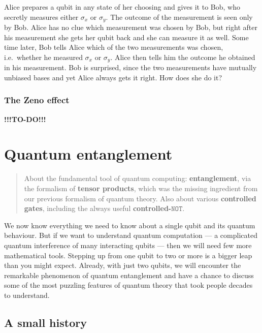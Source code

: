 \documentclass[fleqn]{article}
\let\oldsection\section
\renewcommand\section{\clearpage\oldsection}
\begin{document}
Alice prepares a qubit in any state of her choosing and gives it to Bob, who secretly measures either \(\sigma_x\) or \(\sigma_y\).
The outcome of the measurement is seen only by Bob.
Alice has no clue which measurement was chosen by Bob, but right after his measurement she gets her qubit back and she can measure it as well.
Some time later, Bob tells Alice which of the two measurements was chosen, i.e.~whether he measured \(\sigma_x\) or \(\sigma_y\).
Alice then tells him the outcome he obtained in his measurement.
Bob is surprised, since the two measurements have mutually unbiased bases and yet Alice always gets it right.
How does she do it?

\hypertarget{the-zeno-effect}{%
\subsubsection{The Zeno effect}\label{the-zeno-effect}}

\textbf{!!!TO-DO!!!}

\hypertarget{chapter5}{%
\section{Quantum entanglement}\label{chapter5}}

\begin{quote}
About the fundamental tool of quantum computing: \textbf{entanglement}, via the formalism of \textbf{tensor products}, which was the missing ingredient from our previous formalism of quantum theory.
Also about various \textbf{controlled gates}, including the always useful \textbf{controlled-\(\texttt{NOT}\)}.
\end{quote}

We now know everything we need to know about a single qubit and its quantum behaviour.
But if we want to understand quantum computation --- a complicated quantum interference of many interacting qubits --- then we will need few more mathematical tools.
Stepping up from one qubit to two or more is a bigger leap than you might expect.
Already, with just two qubits, we will encounter the remarkable phenomenon of quantum entanglement and have a chance to discuss some of the most puzzling features of quantum theory that took people decades to understand.

\hypertarget{a-small-history}{%
\subsection{A small history}\label{a-small-history}}
\end{document}
